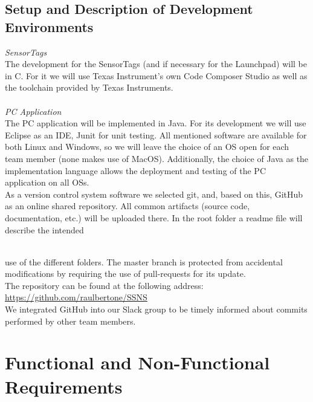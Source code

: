 \documentclass[conference,12pt]{IEEETran}
\begin{document}
\subsection{Setup and Description of Development Environments}
\textit{SensorTags}
\\The development for the SensorTags (and if necessary for the Launchpad) will be in C. For it we will use Texas Instrument’s own Code Composer Studio as well as the toolchain provided by Texas Instruments.\\
\\\textit{PC Application}
\\The PC application will be implemented in Java. For its development we will use Eclipse as an IDE, Junit for unit testing.
All mentioned software are available for both Linux and Windows, so we will leave the choice of an OS open for each team member (none makes use of MacOS). Additionally, the choice of Java as the implementation language allows the deployment and testing of the PC application on all OSs.\\
As a version control system software we selected git, and, based on this, GitHub as an online shared repository. All common artifacts (source code, documentation, etc.) will be uploaded there. In the root folder a readme file will describe the intended\\\\

\vskip 3cm 

use of the different folders. The master branch is protected from accidental modifications by requiring the use of pull-requests for its update.\\
The repository can be found at the following address:\\ \url{https://github.com/raulbertone/SSNS}
\\We integrated GitHub into our Slack group to be timely informed about commits performed by other team members.

\section{Functional and Non-Functional Requirements}
\end{document}
